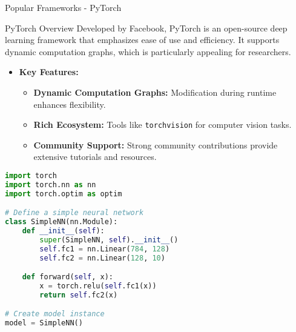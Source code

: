 \documentclass[aspectratio=169]{beamer}
\begin{document}
\begin{frame}{Popular Frameworks - PyTorch}
    \begin{block}{PyTorch Overview}
        Developed by Facebook, PyTorch is an open-source deep learning framework that emphasizes ease of use and efficiency. 
        It supports dynamic computation graphs, which is particularly appealing for researchers.
    \end{block}

    \begin{itemize}
        \item \textbf{Key Features:}
        \begin{itemize}
            \item \textbf{Dynamic Computation Graphs:} Modification during runtime enhances flexibility.
            \item \textbf{Rich Ecosystem:} Tools like \texttt{torchvision} for computer vision tasks.
            \item \textbf{Community Support:} Strong community contributions provide extensive tutorials and resources.
        \end{itemize}
    \end{itemize}

    \begin{lstlisting}[language=Python]
import torch
import torch.nn as nn
import torch.optim as optim

# Define a simple neural network
class SimpleNN(nn.Module):
    def __init__(self):
        super(SimpleNN, self).__init__()
        self.fc1 = nn.Linear(784, 128)
        self.fc2 = nn.Linear(128, 10)

    def forward(self, x):
        x = torch.relu(self.fc1(x))
        return self.fc2(x)

# Create model instance
model = SimpleNN()
    \end{lstlisting}
\end{frame}
\end{document}

